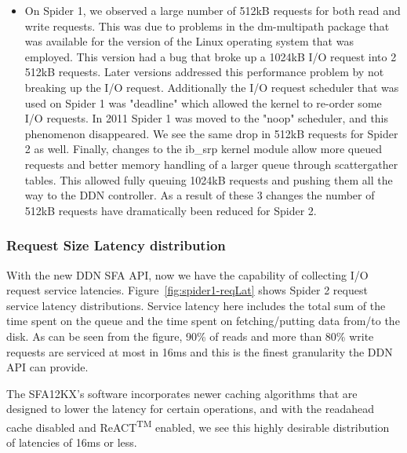 \begin{itemize}
\item   On Spider 1, we observed a large number of 512kB requests for both read
and write requests. This was due to problems in the dm-multipath \cite{mpath} 
package that was available for the version of the Linux operating system that was 
employed. This version had a bug that broke up a 1024kB I/O request into 2 
512kB requests. Later versions addressed this performance problem by not breaking 
up the I/O request. Additionally the I/O request scheduler that was used on 
Spider 1 was "deadline" which allowed the kernel to re-order some I/O requests. 
In 2011 Spider 1 was moved to the "noop" scheduler, and this phenomenon 
disappeared. We see the same drop in 512kB requests for Spider 2 as well. Finally, 
changes to the ib\_srp kernel module allow more queued requests and better memory 
handling of a larger queue through scatter\/gather tables. This allowed fully 
queuing 1024kB requests and pushing them all the way to the DDN controller. As 
a result of these 3 changes the number of 512kB requests have dramatically been 
reduced for Spider 2.
\end{itemize}

\subsubsection{Request Size Latency distribution}

With the new DDN SFA API, now we have the capability of collecting I/O request
service latencies. Figure~\ref{fig:spider1-reqLat} shows Spider 2 request service
latency distributions. Service latency here includes the total sum of the time
spent on the queue and the time spent on fetching/putting data from/to the
disk. As can be seen from the figure, 90\% of reads and more than 80\% write
requests are serviced at most in 16ms and this is the finest granularity the
DDN API can provide. 

The SFA12KX's software incorporates newer caching algorithms that are designed to 
lower the latency for certain operations, and with the readahead cache disabled 
and ReACT\textsuperscript{TM} enabled, we see this highly desirable distribution 
of latencies of 16ms or less.

